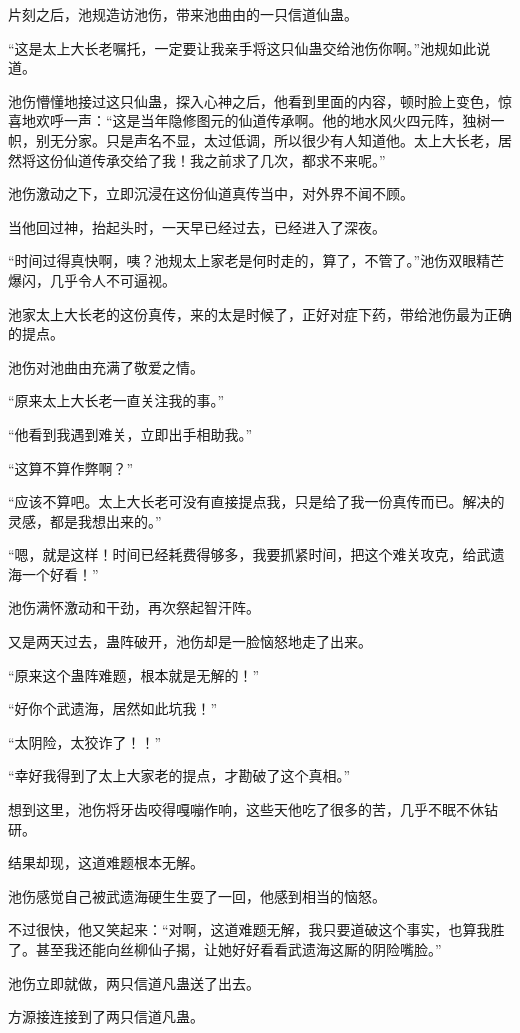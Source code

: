 \begin{this_body}
片刻之后，池规造访池伤，带来池曲由的一只信道仙蛊。

“这是太上大长老嘱托，一定要让我亲手将这只仙蛊交给池伤你啊。”池规如此说道。

池伤懵懂地接过这只仙蛊，探入心神之后，他看到里面的内容，顿时脸上变色，惊喜地欢呼一声：“这是当年隐修图元的仙道传承啊。他的地水风火四元阵，独树一帜，别无分家。只是声名不显，太过低调，所以很少有人知道他。太上大长老，居然将这份仙道传承交给了我！我之前求了几次，都求不来呢。”

池伤激动之下，立即沉浸在这份仙道真传当中，对外界不闻不顾。

当他回过神，抬起头时，一天早已经过去，已经进入了深夜。

“时间过得真快啊，咦？池规太上家老是何时走的，算了，不管了。”池伤双眼精芒爆闪，几乎令人不可逼视。

池家太上大长老的这份真传，来的太是时候了，正好对症下药，带给池伤最为正确的提点。

池伤对池曲由充满了敬爱之情。

“原来太上大长老一直关注我的事。”

“他看到我遇到难关，立即出手相助我。”

“这算不算作弊啊？”

“应该不算吧。太上大长老可没有直接提点我，只是给了我一份真传而已。解决的灵感，都是我想出来的。”

“嗯，就是这样！时间已经耗费得够多，我要抓紧时间，把这个难关攻克，给武遗海一个好看！”

池伤满怀激动和干劲，再次祭起智汗阵。

又是两天过去，蛊阵破开，池伤却是一脸恼怒地走了出来。

“原来这个蛊阵难题，根本就是无解的！”

“好你个武遗海，居然如此坑我！”

“太阴险，太狡诈了！！”

“幸好我得到了太上大家老的提点，才勘破了这个真相。”

想到这里，池伤将牙齿咬得嘎嘣作响，这些天他吃了很多的苦，几乎不眠不休钻研。

结果却现，这道难题根本无解。

池伤感觉自己被武遗海硬生生耍了一回，他感到相当的恼怒。

不过很快，他又笑起来：“对啊，这道难题无解，我只要道破这个事实，也算我胜了。甚至我还能向丝柳仙子揭，让她好好看看武遗海这厮的阴险嘴脸。”

池伤立即就做，两只信道凡蛊送了出去。

方源接连接到了两只信道凡蛊。


\end{this_body}
